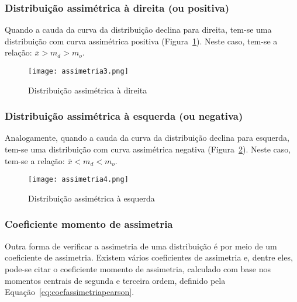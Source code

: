 \documentclass[11pt,fleqn]{book} %
\begin{document}
\subsubsection{Distribuição assimétrica à direita (ou positiva)}
\vspace{0,1cm}

Quando a cauda da curva da distribuição declina para direita, tem-se uma distribuição com curva assimétrica positiva (Figura~\ref{fig:distassimetricapositiva}). Neste caso, tem-se a relação: $\bar{x}>m_d>m_o$. \\

\begin{figure}[h!]
\centering\texttt{[image: assimetria3.png]}
\setlength\belowcaptionskip{1cm}
\caption{Distribuição assimétrica à direita}
\label{fig:distassimetricapositiva} %
\end{figure}


\subsubsection{Distribuição assimétrica à esquerda (ou negativa)}
\vspace{0,1cm}

Analogamente, quando a cauda da curva da distribuição declina para esquerda, tem-se uma distribuição com curva assimétrica negativa (Figura~\ref{fig:distassimetricanegativa}). Neste caso, tem-se a relação: $\bar{x}<m_d<m_o$. \\

\begin{figure}[h!]
\centering\texttt{[image: assimetria4.png]}
\caption{Distribuição assimétrica à esquerda}
\label{fig:distassimetricanegativa} %
\end{figure}

\vspace{4cm}

\subsubsection{Coeficiente momento de assimetria}

Outra forma de verificar a assimetria de uma distribuição é por meio de um coeficiente de assimetria. Existem vários coeficientes de assimetria e, dentre eles, pode-se citar o coeficiente momento de assimetria, calculado com base nos momentos centrais de segunda e terceira ordem, definido pela Equação~\ref{eq:coefassimetriapearson}. \\
\end{document}
